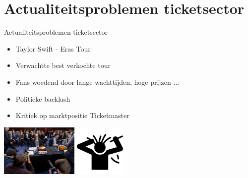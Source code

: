 \documentclass{beamer}
\begin{document}
\section[Actualiteitsproblemen]{Actualiteitsproblemen ticketsector}
\begin{frame}{Actualiteitsproblemen ticketsector}
    \begin{itemize}
        \item Taylor Swift - Eras Tour
        \item Verwachtte best verkochte tour
        \item Fans woedend door lange wachttijden, hoge prijzen ...
        \item Politieke backlash
        \item Kritiek op marktpositie Ticketmaster
    \end{itemize}
    \begin{center}
        \includegraphics[height = 2.5cm]{senate-hearing.jpg}
        \includegraphics[height = 2.5cm]{frustratie.png}     
    \end{center}
\end{frame}
\end{document}

